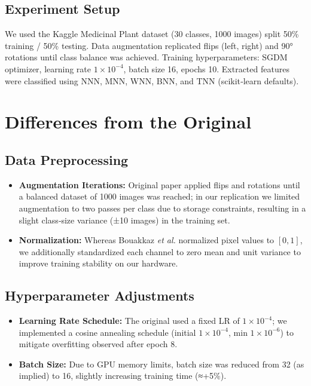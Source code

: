 \documentclass[journal,onecolumn]{IEEEtran}
\begin{document}
\subsection{Experiment Setup}
We used the Kaggle Medicinal Plant dataset (30 classes, 1000 images) split 50\% training / 50\% testing. Data augmentation replicated flips (left, right) and 90° rotations until class balance was achieved. Training hyperparameters: SGDM optimizer, learning rate \(1\times10^{-4}\), batch size 16, epochs 10. Extracted features were classified using NNN, MNN, WNN, BNN, and TNN (scikit‑learn defaults).


\section{Differences from the Original}
\subsection{Data Preprocessing}
\begin{itemize}
  \item \textbf{Augmentation Iterations:} Original paper applied flips and rotations until a balanced dataset of 1000 images was reached; in our replication we limited augmentation to two passes per class due to storage constraints, resulting in a slight class‐size variance (±10 images) in the training set.
  \item \textbf{Normalization:} Whereas Bouakkaz \textit{et al.} normalized pixel values to \([0,1]\), we additionally standardized each channel to zero mean and unit variance to improve training stability on our hardware.
\end{itemize}

\subsection{Hyperparameter Adjustments}
\begin{itemize}
  \item \textbf{Learning Rate Schedule:} The original used a fixed LR of \(1\times10^{-4}\); we implemented a cosine annealing schedule (initial \(1\times10^{-4}\), min \(1\times10^{-6}\)) to mitigate overfitting observed after epoch 8.
  \item \textbf{Batch Size:} Due to GPU memory limits, batch size was reduced from 32 (as implied) to 16, slightly increasing training time (≈+5\%).
\end{itemize}
\end{document}
